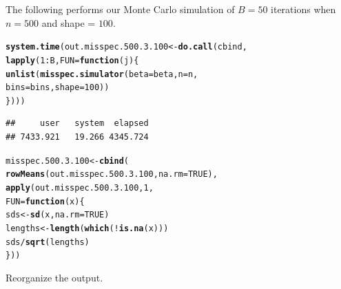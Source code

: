 \documentclass[11pt]{article}\usepackage[]{graphicx}\usepackage[]{color}
\makeatletter
\newcommand{\hlnum}[1]{\textcolor[rgb]{0.686,0.059,0.569}{#1}}%
\newcommand{\hlopt}[1]{\textcolor[rgb]{0,0,0}{#1}}%
\newcommand{\hlstd}[1]{\textcolor[rgb]{0.345,0.345,0.345}{#1}}%
\newcommand{\hlkwa}[1]{\textcolor[rgb]{0.161,0.373,0.58}{\textbf{#1}}}%
\newcommand{\hlkwb}[1]{\textcolor[rgb]{0.69,0.353,0.396}{#1}}%
\newcommand{\hlkwc}[1]{\textcolor[rgb]{0.333,0.667,0.333}{#1}}%
\newcommand{\hlkwd}[1]{\textcolor[rgb]{0.737,0.353,0.396}{\textbf{#1}}}%
\newenvironment{kframe}{%
 \def\at@end@of@kframe{}%
 \ifinner\ifhmode%
  \def\at@end@of@kframe{\end{minipage}}%
  \begin{minipage}{\columnwidth}%
 \fi\fi%
 \def\FrameCommand##1{\hskip\@totalleftmargin \hskip-\fboxsep
 \colorbox{shadecolor}{##1}\hskip-\fboxsep
     \hskip-\linewidth \hskip-\@totalleftmargin \hskip\columnwidth}%
 \MakeFramed {\advance\hsize-\width
   \@totalleftmargin\z@ \linewidth\hsize
   \@setminipage}}%
 {\par\unskip\endMakeFramed%
 \at@end@of@kframe}
\newenvironment{knitrout}{}{} %
\makeatother
\begin{document}
The following performs our Monte Carlo simulation of $B = 50$ iterations 
when $n = 500$ and shape = $100$.

\begin{knitrout}
\color{fgcolor}\begin{kframe}
\begin{alltt}
\hlkwd{system.time}\hlstd{(out.misspec.500.3.100} \hlkwb{<-} \hlkwd{do.call}\hlstd{(cbind,}
  \hlkwd{lapply}\hlstd{(}\hlnum{1}\hlopt{:}\hlstd{B,} \hlkwc{FUN} \hlstd{=} \hlkwa{function}\hlstd{(}\hlkwc{j}\hlstd{)\{}
    \hlkwd{unlist}\hlstd{(}\hlkwd{misspec.simulator}\hlstd{(}\hlkwc{beta} \hlstd{= beta,} \hlkwc{n} \hlstd{= n,}
      \hlkwc{bins} \hlstd{= bins,} \hlkwc{shape} \hlstd{=} \hlnum{100}\hlstd{))}
\hlstd{\})))}
\end{alltt}
\begin{verbatim}
##     user   system  elapsed 
## 7433.921   19.266 4345.724
\end{verbatim}
\end{kframe}
\end{knitrout}

\begin{knitrout}
\color{fgcolor}\begin{kframe}
\begin{alltt}
\hlstd{misspec.500.3.100} \hlkwb{<-} \hlkwd{cbind}\hlstd{(}
  \hlkwd{rowMeans}\hlstd{(out.misspec.500.3.100,} \hlkwc{na.rm} \hlstd{=} \hlnum{TRUE}\hlstd{),}
  \hlkwd{apply}\hlstd{(out.misspec.500.3.100,} \hlnum{1}\hlstd{,}
  \hlkwc{FUN} \hlstd{=} \hlkwa{function}\hlstd{(}\hlkwc{x}\hlstd{)\{}
    \hlstd{sds} \hlkwb{<-} \hlkwd{sd}\hlstd{(x,} \hlkwc{na.rm} \hlstd{=} \hlnum{TRUE}\hlstd{)}
    \hlstd{lengths} \hlkwb{<-} \hlkwd{length}\hlstd{(}\hlkwd{which}\hlstd{(}\hlopt{!}\hlkwd{is.na}\hlstd{(x)))}
    \hlstd{sds} \hlopt{/} \hlkwd{sqrt}\hlstd{(lengths)}
  \hlstd{\}))}
\end{alltt}
\end{kframe}
\end{knitrout}

Reorganize the output.
\end{document}
